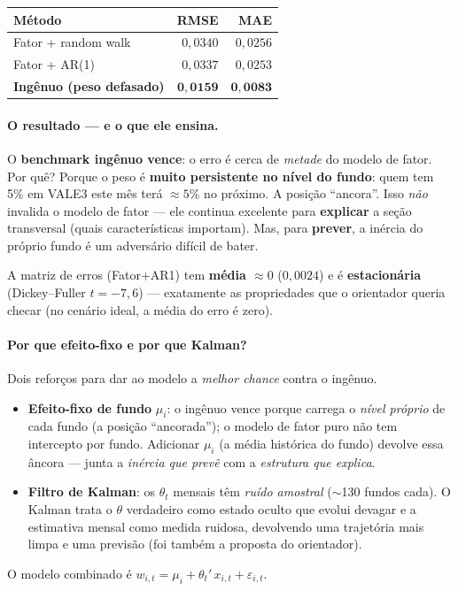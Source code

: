 \documentclass[11pt]{article}
\begin{document}
\begin{table}[h]\centering
\begin{tabular}{@{}lrr@{}}
\toprule
Método & RMSE & MAE \\
\midrule
Fator + random walk          & $0{,}0340$ & $0{,}0256$ \\
Fator + AR(1)                & $0{,}0337$ & $0{,}0253$ \\
\textbf{Ingênuo (peso defasado)} & $\mathbf{0{,}0159}$ & $\mathbf{0{,}0083}$ \\
\bottomrule
\end{tabular}
\end{table}

\paragraph{O resultado --- e o que ele ensina.} O \textbf{benchmark ingênuo vence}: o
erro é cerca de \emph{metade} do modelo de fator. Por quê? Porque o peso é
\textbf{muito persistente no nível do fundo}: quem tem 5\% em VALE3 este mês terá
$\approx5\%$ no próximo. A posição ``ancora''. Isso \emph{não} invalida o modelo de
fator --- ele continua excelente para \textbf{explicar} a seção transversal (quais
características importam). Mas, para \textbf{prever}, a inércia do próprio fundo é um
adversário difícil de bater.

A matriz de erros (Fator+AR1) tem \textbf{média $\approx 0$} ($0{,}0024$) e é
\textbf{estacionária} (Dickey--Fuller $t=-7{,}6$) --- exatamente as propriedades que o
orientador queria checar (no cenário ideal, a média do erro é zero).

\paragraph{Por que efeito-fixo e por que Kalman?} Dois reforços para dar ao modelo a
\emph{melhor chance} contra o ingênuo.
\begin{itemize}[noitemsep]
\item \textbf{Efeito-fixo de fundo} $\mu_i$: o ingênuo vence porque carrega o
\emph{nível próprio} de cada fundo (a posição ``ancorada''); o modelo de fator puro não
tem intercepto por fundo. Adicionar $\mu_i$ (a média histórica do fundo) devolve essa
âncora --- junta a \emph{inércia que prevê} com a \emph{estrutura que explica}.
\item \textbf{Filtro de Kalman}: os $\theta_t$ mensais têm \emph{ruído amostral}
($\sim$130 fundos cada). O Kalman trata o $\theta$ verdadeiro como estado oculto que
evolui devagar e a estimativa mensal como medida ruidosa, devolvendo uma trajetória mais
limpa e uma previsão (foi também a proposta do orientador).
\end{itemize}
O modelo combinado é $w_{i,t}=\mu_i+\theta_t'\,x_{i,t}+\varepsilon_{i,t}$.
\end{document}
